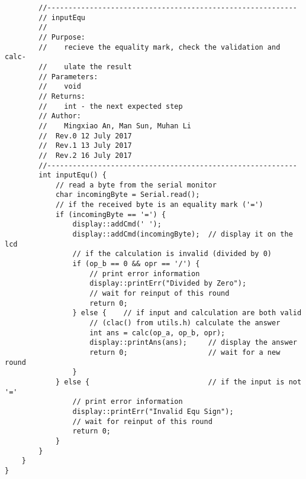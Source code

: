 \begin{verbatim}
        //-----------------------------------------------------------  
        // inputEqu 
        //  
        // Purpose:  
        //    recieve the equality mark, check the validation and calc-
        //    ulate the result
        // Parameters:  
        //    void 
        // Returns:  
        //    int - the next expected step   
        // Author:  
        //    Mingxiao An, Man Sun, Muhan Li
        //  Rev.0 12 July 2017
        //  Rev.1 13 July 2017
        //  Rev.2 16 July 2017
        //----------------------------------------------------------- 
        int inputEqu() {
            // read a byte from the serial monitor
            char incomingByte = Serial.read();
            // if the received byte is an equality mark ('=')               
            if (incomingByte == '=') {                      
                display::addCmd(' ');
                display::addCmd(incomingByte);  // display it on the lcd
                // if the calculation is invalid (divided by 0)
                if (op_b == 0 && opr == '/') {  
                    // print error information          
                    display::printErr("Divided by Zero");   
                    // wait for reinput of this round
                    return 0;                   
                } else {    // if input and calculation are both valid
                    // (clac() from utils.h) calculate the answer
                    int ans = calc(op_a, op_b, opr);        
                    display::printAns(ans);     // display the answer           
                    return 0;                   // wait for a new round
                }
            } else {                            // if the input is not '='
                // print error information
                display::printErr("Invalid Equ Sign");  
                // wait for reinput of this round   
                return 0;                                   
            }
        }
    }
}

\end{verbatim}


